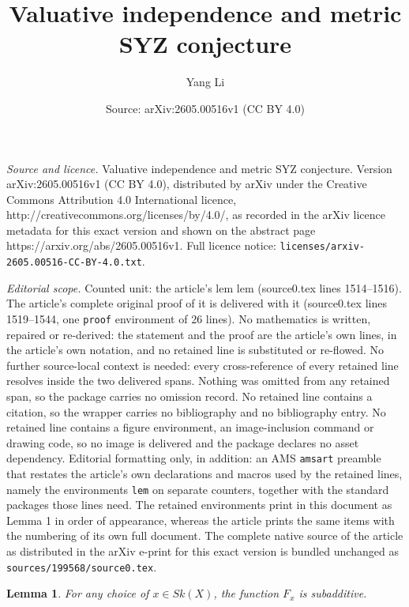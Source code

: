 \documentclass[10pt,a4paper]{amsart}
\title{Valuative independence and metric SYZ conjecture}
\author{Yang Li}
\date{Source: arXiv:2605.00516v1 (CC BY 4.0)}
\newtheorem{lem}{Lemma}
\begin{document}
\maketitle

\noindent\emph{Source and licence.} Valuative independence and metric SYZ conjecture. Version arXiv:2605.00516v1 (CC BY 4.0), distributed by arXiv under the Creative Commons Attribution 4.0 International licence, http://creativecommons.org/licenses/by/4.0/, as recorded in the arXiv licence metadata for this exact version and shown on the abstract page https://arxiv.org/abs/2605.00516v1. Full licence notice: \texttt{licenses/arxiv-2605.00516-CC-BY-4.0.txt}.\par\smallskip

\noindent\textit{Editorial scope.} Counted unit: the article's lem lem (source0.tex lines 1514--1516). The article's complete original proof of it is delivered with it (source0.tex lines 1519--1544, one \texttt{proof} environment of 26 lines). No mathematics is written, repaired or re-derived: the statement and the proof are the article's own lines, in the article's own notation, and no retained line is substituted or re-flowed.  No further source-local context is needed: every cross-reference of every retained line resolves inside the two delivered spans.  Nothing was omitted from any retained span, so the package carries no omission record.  No retained line contains a citation, so the wrapper carries no bibliography and no bibliography entry.  No retained line contains a figure environment, an image-inclusion command or drawing code, so no image is delivered and the package declares no asset dependency.  Editorial formatting only, in addition: an AMS \texttt{amsart} preamble that restates the article's own declarations and macros used by the retained lines, namely the environments \texttt{lem} on separate counters, together with the standard packages those lines need.  The retained environments print in this document as Lemma 1 in order of appearance, whereas the article prints the same items with the numbering of its own full document.  The complete native source of the article as distributed in the arXiv e-print for this exact version is bundled unchanged as \texttt{sources/199568/source0.tex}.
	\begin{lem}
		For any choice of $x\in Sk(X)$, the function $F_x$ is subadditive.
\end{lem}
\end{document}
